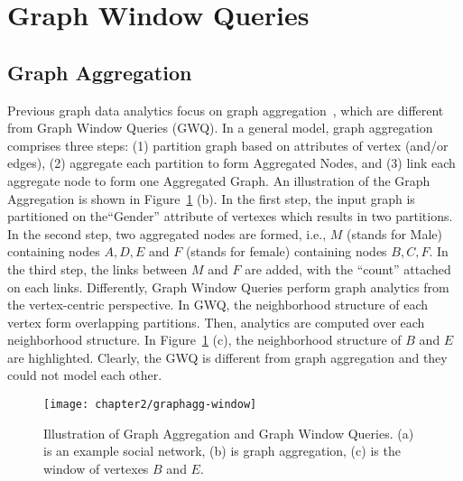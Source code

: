 \section{Graph Window Queries}

\subsection{Graph Aggregation}
Previous graph data analytics focus on graph aggregation~\cite{zhao2011graph,wang2014pagrol,chen2008graph,tian2008efficient},
which are different from Graph Window Queries (GWQ).
In a general model, graph aggregation comprises three steps: (1) partition
graph based on attributes of vertex (and/or edges), (2) aggregate each
partition to form Aggregated Nodes, and (3) link each aggregate node to
form one Aggregated Graph. An illustration of the Graph Aggregation is shown 
in Figure~\ref{fig:rw-agg-window} (b). In the first step, the input graph
is partitioned on the``Gender'' attribute of vertexes which results in two partitions. In the second
step, two aggregated nodes are formed, i.e., $M$ (stands for Male) containing nodes $A,D,E$
and $F$ (stands for female) containing nodes $B,C,F$. In the third step, the links between 
$M$ and $F$ are added, with the ``count'' attached on each links. 
Differently, Graph Window Queries perform graph analytics from the vertex-centric perspective.
In GWQ, the neighborhood structure of each vertex form overlapping partitions. Then,
analytics are computed over each neighborhood structure. In
Figure~\ref{fig:rw-agg-window} (c), the neighborhood structure of $B$ and $E$
are highlighted. Clearly, the GWQ is different from graph aggregation
and they could not model each other.
%

\begin{figure}[h]
\centering
\texttt{[image: chapter2/graphagg-window]}
\caption{Illustration of Graph Aggregation and Graph Window Queries. (a) is an example social network, (b) is graph aggregation, (c) is the window of vertexes $B$ and $E$.}
\label{fig:rw-agg-window}
\end{figure}




